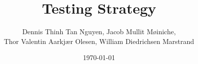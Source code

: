 \documentclass{article}
\author{Dennis Thinh Tan Nguyen, Jacob Mullit M{\o}iniche,\\
 		Thor Valentin Aarkjær Olesen, William Diedrichsen Marstrand}
\date{\today}
\title{Testing Strategy}
\begin{document}
\maketitle
\pagebreak
\tableofcontents
\pagebreak







\end{document}
